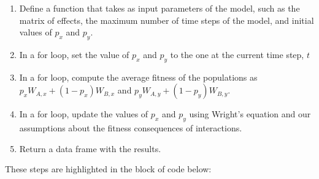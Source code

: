 \documentclass[
]{book}
\begin{document}
\begin{enumerate}
\def\labelenumi{\arabic{enumi}.}
\item
  Define a function that takes as input parameters of the model, such as the matrix of effects, the maximum number of time steps of the model, and initial values of \(p_{x}\) and \(p_{y}\).
\item
  In a for loop, set the value of \(p_{x}\) and \(p_{y}\) to the one at the current time step, \(t\)
\item
  In a for loop, compute the average fitness of the populations as \(p_{x}W_{A,x}+(1-p_{x})W_{B,x}\) and \(p_{y}W_{A,y}+(1-p_{y})W_{B,y}\).
\item
  In a for loop, update the values of \(p_{x}\) and \(p_{y}\) using Wright's equation and our assumptions about the fitness consequences of interactions.
\item
  Return a data frame with the results.
\end{enumerate}

These steps are highlighted in the block of code below:
\end{document}
